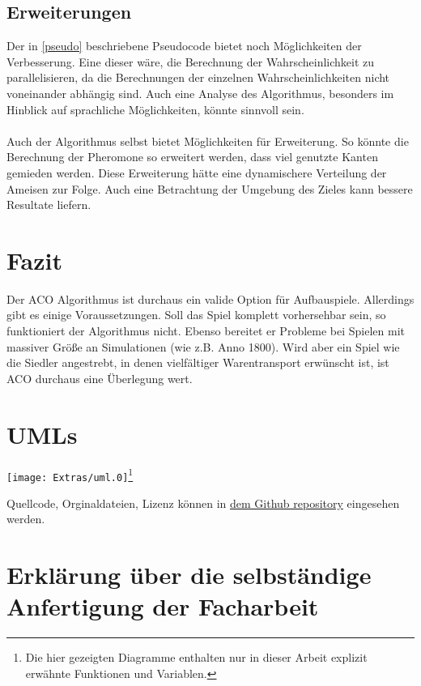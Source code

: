 \documentclass[12pt]{article}
\begin{document}
\subsection{Erweiterungen}
Der in \ref{pseudo} beschriebene Pseudocode bietet noch Möglichkeiten der Verbesserung.
Eine dieser wäre, die Berechnung der Wahrscheinlichkeit zu parallelisieren, da die Berechnungen der einzelnen Wahrscheinlichkeiten nicht voneinander abhängig sind. Auch eine Analyse des Algorithmus, besonders im Hinblick auf sprachliche Möglichkeiten, könnte sinnvoll sein.\\\\
Auch der Algorithmus selbst bietet Möglichkeiten für Erweiterung. So könnte die Berechnung der Pheromone so erweitert werden, dass viel genutzte Kanten gemieden werden. Diese Erweiterung hätte eine dynamischere Verteilung der Ameisen zur Folge. Auch eine Betrachtung der Umgebung des Zieles kann bessere Resultate liefern.
\section{Fazit}
Der ACO Algorithmus ist durchaus ein valide Option für Aufbauspiele. Allerdings gibt es einige Voraussetzungen. Soll das Spiel komplett vorhersehbar sein, so funktioniert der Algorithmus nicht. Ebenso bereitet er Probleme bei Spielen mit massiver Größe an Simulationen (wie z.B. Anno 1800).
Wird aber ein Spiel wie die Siedler angestrebt, in denen vielfältiger Warentransport erwünscht ist, ist ACO durchaus eine Überlegung wert.


\section{UMLs}
\begin{center}
\texttt{[image: Extras/uml.0]}\footnote{Die hier gezeigten Diagramme enthalten nur in dieser Arbeit explizit erwähnte Funktionen und Variablen.}
\end{center}
\nocite{*}
\printbibliography[heading=bibnumbered]
Quellcode, Orginaldateien, Lizenz können in \href{https://github.com/Kauruck/Facharbeit_AOC}{dem Github repository} eingesehen werden.

\section{Erklärung über die selbständige Anfertigung der Facharbeit}
\end{document}
